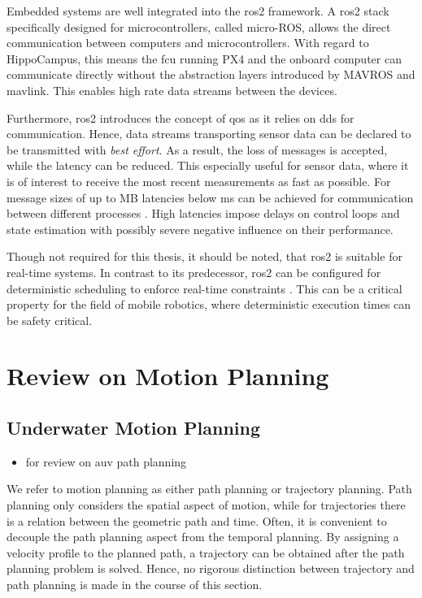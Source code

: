 Embedded systems are well integrated into the \ac{ros2} framework. A \ac{ros2} stack specifically designed for microcontrollers, called micro-ROS, allows the direct communication between computers and microcontrollers. With regard to HippoCampus, this means the \ac{fcu} running PX4 and the onboard computer can communicate directly without the abstraction layers introduced by MAVROS and \ac{mavlink}. This enables high rate data streams between the devices.

Furthermore, \ac{ros2} introduces the concept of \ac{qos} as it relies on \ac{dds} for communication. Hence, data streams transporting sensor data can be declared to be transmitted with \emph{best effort}. As a result, the loss of messages is accepted, while the latency can be reduced. This especially useful for sensor data, where it is of interest to receive the most recent measurements as fast as possible. For message sizes of up to \unit[1]{MB} latencies below \unit[1]{ms} can be achieved for communication between different processes \cite{ros2}. High latencies impose delays on control loops and state estimation with possibly severe negative influence on their performance.

Though not required for this thesis, it should be noted, that \ac{ros2} is suitable for real-time systems. In contrast to its predecessor, \ac{ros2} can be configured for deterministic scheduling to enforce real-time constraints \cite{ros-realtime20}. This can be a critical property for the field of mobile robotics, where deterministic execution times can be safety critical.

\section{Review on Motion Planning}
\label{sec:review-motion-planning}
\subsection{Underwater Motion Planning}
\begin{itemize}
    \color{red}
    \item \cite{Panda20} for review on auv path planning
\end{itemize}
\label{sec:underwater-motion-planning}
We refer to motion planning as either path planning or trajectory planning. Path planning only considers the spatial aspect of motion, while for trajectories there is a relation between the geometric path and time. Often, it is convenient to decouple the path planning aspect from the temporal planning. By assigning a velocity profile to the planned path, a trajectory can be obtained after the path planning problem is solved. Hence, no rigorous distinction between trajectory and path planning is made in the course of this section.

